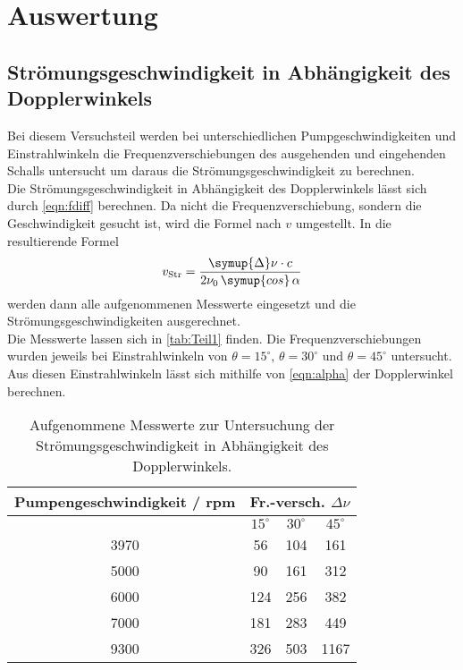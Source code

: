 \section{Auswertung}
\label{sec:Auswertung}

\subsection{Strömungsgeschwindigkeit in Abhängigkeit des Dopplerwinkels}

Bei diesem Versuchsteil werden bei unterschiedlichen Pumpgeschwindigkeiten und Einstrahlwinkeln die
Frequenzverschiebungen des ausgehenden und eingehenden Schalls untersucht um daraus die Strömungsgeschwindigkeit
zu berechnen.\\
Die Strömungsgeschwindigkeit in Abhängigkeit des Dopplerwinkels lässt sich durch \autoref{eqn:fdiff}
berechnen. Da nicht die Frequenzverschiebung, sondern die Geschwindigkeit gesucht ist, wird die Formel
nach $v$ umgestellt. In die resultierende Formel
\begin{equation*}
  v_{\mathrm{Str}} = \frac{\symup{\Delta}\nu\cdot c}{2\nu_0\,\symup{cos}\,\alpha} 
\end{equation*}
werden dann alle aufgenommenen Messwerte eingesetzt und die Strömungsgeschwindigkeiten ausgerechnet.\\
Die Messwerte lassen sich in \autoref{tab:Teil1} finden. Die Frequenzverschiebungen wurden jeweils
bei Einstrahlwinkeln von $\theta= 15 ^{\circ}$, $\theta= 30 ^{\circ}$ und $\theta= 45 ^{\circ}$ untersucht.
Aus diesen Einstrahlwinkeln lässt sich mithilfe von \autoref{eqn:alpha} der Dopplerwinkel berechnen.\\
\begin{table}
  \centering
  \begin{tabular}{c | c | c | c}
    \toprule
    Pumpengeschwindigkeit / rpm & \multicolumn{3}{c}{Fr.-versch. $\Delta \nu$} \\
    \hline
     & $15^\circ$ & $30^\circ$ & $45^\circ$ \\
    \midrule
    3970     &       56     &     104     &    161 \\
    5000     &       90     &     161     &    312 \\
    6000     &       124    &     256     &    382\\
    7000     &       181    &     283     &    449\\
    9300     &       326    &     503    &    1167\\
    \bottomrule
  \end{tabular}
  \caption{Aufgenommene Messwerte zur Untersuchung der Strömungsgeschwindigkeit in Abhängigkeit des Dopplerwinkels.}
  \label{tab:Teil1}
\end{table}

